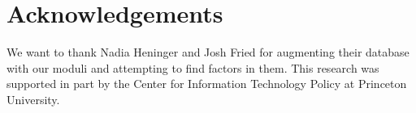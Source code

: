 \section*{Acknowledgements}
We want to thank Nadia Heninger and Josh Fried for augmenting their database
with our moduli and attempting to find factors in them.  This research was
supported in part by the Center for Information Technology Policy at Princeton
University.
